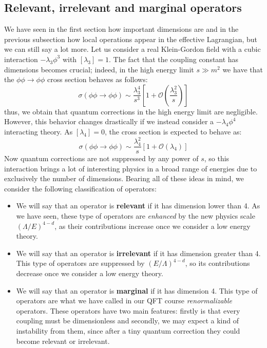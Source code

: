 \documentclass[11pt]{article}
\begin{document}
\subsection{Relevant, irrelevant and marginal operators}
We have seen in the first section how important dimensions are and in the previous subsection how local operations appear in the effective Lagrangian, but we can still say a lot more. Let us consider a real Klein-Gordon field with a cubic interaction $-\lambda_3\phi^3$ with $[\lambda_3]=1$. The fact that the coupling constant has dimensions becomes crucial; indeed, in the high energy limit $s\gg m^2$ we have that the $\phi\phi\to \phi\phi$ cross section behaves as follows:
\begin{equation}
    \sigma(\phi\phi\to \phi\phi)\sim \dfrac{\lambda_3^4}{s^3}\left[1+\mathcal{O}\left(\dfrac{\lambda_3^2}{s}\right) \right]
\end{equation}
thus, we obtain that quantum corrections in the high energy limit are negligible. However, this behavior changes drastically if we instead consider a $-\lambda_4\phi^4$ interacting theory. As $[\lambda_4]=0$, the cross section is expected to behave as:
\begin{equation}
    \sigma(\phi\phi\to \phi\phi)\sim \dfrac{\lambda_4^2}{s}\left[1+\mathcal{O}\left(\lambda_4\right) \right]
\end{equation}
Now quantum corrections are not suppressed by any power of $s$, so this interaction brings a lot of interesting physics in a broad range of energies due to exclusively the number of dimensions. Bearing all of these ideas in mind, we consider the following classification of operators:
\begin{itemize}
    \item We will say that an operator is \textbf{relevant} if it has dimension lower than 4. As we have seen, these type of operators are \textit{enhanced} by the new physics scale $(\Lambda/E)^{4-d}$, as their contributions increase once we consider a low energy theory.
    \item  We will say that an operator is \textbf{irrelevant} if it has dimension greater than 4.  This type of operators are suppressed by $(E/\Lambda)^{4-d}$, so its contributions decrease once we consider a low energy theory. 
    \item We will say that an operator is \textbf{marginal} if it has dimension 4. This type of operators are what we have called in our QFT course \textit{renormalizable} operators. These operators have two main features: firstly is that every coupling must be dimensionless and secondly, we may expect a kind of instability from them, since after a tiny quantum correction they could become relevant or irrelevant.
\end{itemize}
\end{document}
